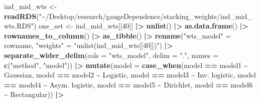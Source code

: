 \documentclass[
]{article}
\newenvironment{Shaded}{\begin{snugshade}}{\end{snugshade}}
\newcommand{\AttributeTok}[1]{\textcolor[rgb]{0.13,0.29,0.53}{#1}}
\newcommand{\DecValTok}[1]{\textcolor[rgb]{0.00,0.00,0.81}{#1}}
\newcommand{\FunctionTok}[1]{\textcolor[rgb]{0.13,0.29,0.53}{\textbf{#1}}}
\newcommand{\NormalTok}[1]{#1}
\newcommand{\OtherTok}[1]{\textcolor[rgb]{0.56,0.35,0.01}{#1}}
\newcommand{\SpecialCharTok}[1]{\textcolor[rgb]{0.81,0.36,0.00}{\textbf{#1}}}
\newcommand{\StringTok}[1]{\textcolor[rgb]{0.31,0.60,0.02}{#1}}
\begin{document}
\begin{Shaded}
\begin{Highlighting}[]
\NormalTok{ind\_mid\_wts }\OtherTok{\textless{}{-}} \FunctionTok{readRDS}\NormalTok{(}\StringTok{"\textasciitilde{}/Desktop/research/gaugeDependence/stacking\_weights/ind\_mid\_wts.RDS"}\NormalTok{)}
\NormalTok{one\_set }\OtherTok{\textless{}{-}}\NormalTok{ ind\_mid\_wts[[}\DecValTok{40}\NormalTok{]] }\SpecialCharTok{|\textgreater{}} \FunctionTok{unlist}\NormalTok{() }\SpecialCharTok{|\textgreater{}} 
  \FunctionTok{as.data.frame}\NormalTok{() }\SpecialCharTok{|\textgreater{}} 
  \FunctionTok{rownames\_to\_column}\NormalTok{() }\SpecialCharTok{|\textgreater{}} 
  \FunctionTok{as\_tibble}\NormalTok{() }\SpecialCharTok{|\textgreater{}}
  \FunctionTok{rename}\NormalTok{(}\StringTok{"wts\_model"} \OtherTok{=}\NormalTok{ rowname, }\StringTok{"weights"} \OtherTok{=} \StringTok{"unlist(ind\_mid\_wts[[40]])"}\NormalTok{) }\SpecialCharTok{|\textgreater{}}
  \FunctionTok{separate\_wider\_delim}\NormalTok{(}\AttributeTok{cols =} \StringTok{"wts\_model"}\NormalTok{, }\AttributeTok{delim =} \StringTok{"."}\NormalTok{, }\AttributeTok{names =} \FunctionTok{c}\NormalTok{(}\StringTok{"method"}\NormalTok{, }\StringTok{"model"}\NormalTok{)) }\SpecialCharTok{|\textgreater{}}
  \FunctionTok{mutate}\NormalTok{(}\AttributeTok{model =} \FunctionTok{case\_when}\NormalTok{(model }\SpecialCharTok{==} \StringTok{\textquotesingle{}model1\textquotesingle{}} \SpecialCharTok{\textasciitilde{}} \StringTok{\textquotesingle{}Gaussian\textquotesingle{}}\NormalTok{,}
\NormalTok{                           model }\SpecialCharTok{==} \StringTok{\textquotesingle{}model2\textquotesingle{}} \SpecialCharTok{\textasciitilde{}} \StringTok{\textquotesingle{}Logistic\textquotesingle{}}\NormalTok{,}
\NormalTok{                           model }\SpecialCharTok{==} \StringTok{\textquotesingle{}model3\textquotesingle{}} \SpecialCharTok{\textasciitilde{}} \StringTok{\textquotesingle{}Inv. logistic\textquotesingle{}}\NormalTok{,}
\NormalTok{                           model }\SpecialCharTok{==} \StringTok{\textquotesingle{}model4\textquotesingle{}} \SpecialCharTok{\textasciitilde{}} \StringTok{\textquotesingle{}Asym. logistic\textquotesingle{}}\NormalTok{,}
\NormalTok{                           model }\SpecialCharTok{==} \StringTok{\textquotesingle{}model5\textquotesingle{}} \SpecialCharTok{\textasciitilde{}} \StringTok{\textquotesingle{}Dirichlet\textquotesingle{}}\NormalTok{,}
\NormalTok{                           model }\SpecialCharTok{==} \StringTok{\textquotesingle{}model6\textquotesingle{}} \SpecialCharTok{\textasciitilde{}} \StringTok{\textquotesingle{}Rectangular\textquotesingle{}}\NormalTok{)) }\SpecialCharTok{|\textgreater{}}

\end{Highlighting}
\end{Shaded}
\end{document}
